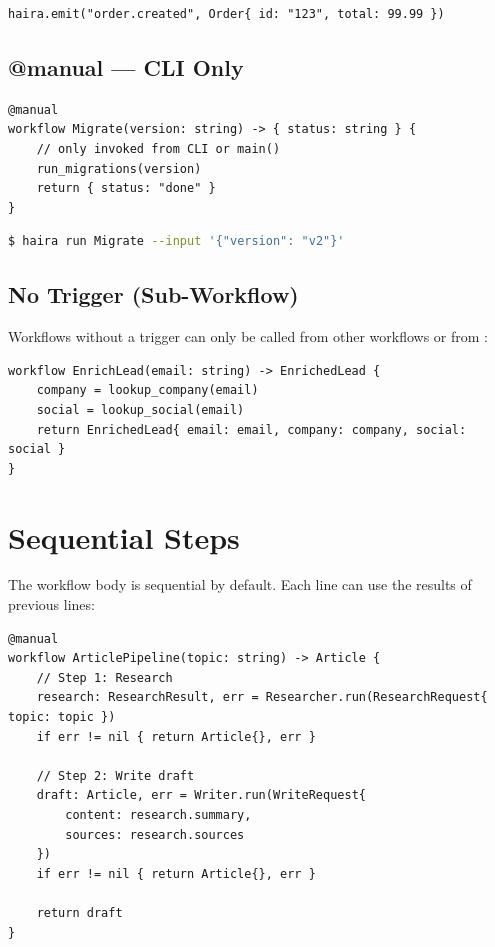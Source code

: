 \begin{lstlisting}
haira.emit("order.created", Order{ id: "123", total: 99.99 })
\end{lstlisting}

\subsection{@manual --- CLI Only}

\begin{lstlisting}
@manual
workflow Migrate(version: string) -> { status: string } {
    // only invoked from CLI or main()
    run_migrations(version)
    return { status: "done" }
}
\end{lstlisting}

\begin{lstlisting}[language=bash,numbers=none]
$ haira run Migrate --input '{"version": "v2"}'
\end{lstlisting}

\subsection{No Trigger (Sub-Workflow)}

Workflows without a trigger can only be called from other workflows or from :

\begin{lstlisting}
workflow EnrichLead(email: string) -> EnrichedLead {
    company = lookup_company(email)
    social = lookup_social(email)
    return EnrichedLead{ email: email, company: company, social: social }
}
\end{lstlisting}

\section{Sequential Steps}

The workflow body is sequential by default. Each line can use the results of previous lines:

\begin{lstlisting}
@manual
workflow ArticlePipeline(topic: string) -> Article {
    // Step 1: Research
    research: ResearchResult, err = Researcher.run(ResearchRequest{ topic: topic })
    if err != nil { return Article{}, err }

    // Step 2: Write draft
    draft: Article, err = Writer.run(WriteRequest{
        content: research.summary,
        sources: research.sources
    })
    if err != nil { return Article{}, err }

    return draft
}
\end{lstlisting}

